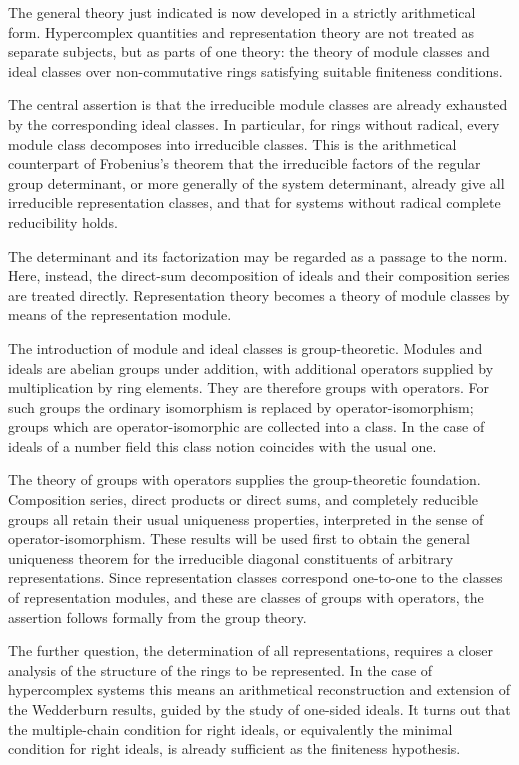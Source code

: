 \documentclass[
  12pt,
]{article}
\begin{document}
The general theory just indicated is now developed in a strictly
arithmetical form. Hypercomplex quantities and representation theory are
not treated as separate subjects, but as parts of one theory: the theory
of module classes and ideal classes over non-commutative rings
satisfying suitable finiteness conditions.

The central assertion is that the irreducible module classes are already
exhausted by the corresponding ideal classes. In particular, for rings
without radical, every module class decomposes into irreducible classes.
This is the arithmetical counterpart of Frobenius's theorem that the
irreducible factors of the regular group determinant, or more generally
of the system determinant, already give all irreducible representation
classes, and that for systems without radical complete reducibility
holds.

The determinant and its factorization may be regarded as a passage to
the norm. Here, instead, the direct-sum decomposition of ideals and
their composition series are treated directly. Representation theory
becomes a theory of module classes by means of the representation
module.

The introduction of module and ideal classes is group-theoretic. Modules
and ideals are abelian groups under addition, with additional operators
supplied by multiplication by ring elements. They are therefore groups
with operators. For such groups the ordinary isomorphism is replaced by
operator-isomorphism; groups which are operator-isomorphic are collected
into a class. In the case of ideals of a number field this class notion
coincides with the usual one.

The theory of groups with operators supplies the group-theoretic
foundation. Composition series, direct products or direct sums, and
completely reducible groups all retain their usual uniqueness
properties, interpreted in the sense of operator-isomorphism. These
results will be used first to obtain the general uniqueness theorem for
the irreducible diagonal constituents of arbitrary representations.
Since representation classes correspond one-to-one to the classes of
representation modules, and these are classes of groups with operators,
the assertion follows formally from the group theory.

The further question, the determination of all representations, requires
a closer analysis of the structure of the rings to be represented. In
the case of hypercomplex systems this means an arithmetical
reconstruction and extension of the Wedderburn results, guided by the
study of one-sided ideals. It turns out that the multiple-chain
condition for right ideals, or equivalently the minimal condition for
right ideals, is already sufficient as the finiteness hypothesis.
\end{document}
